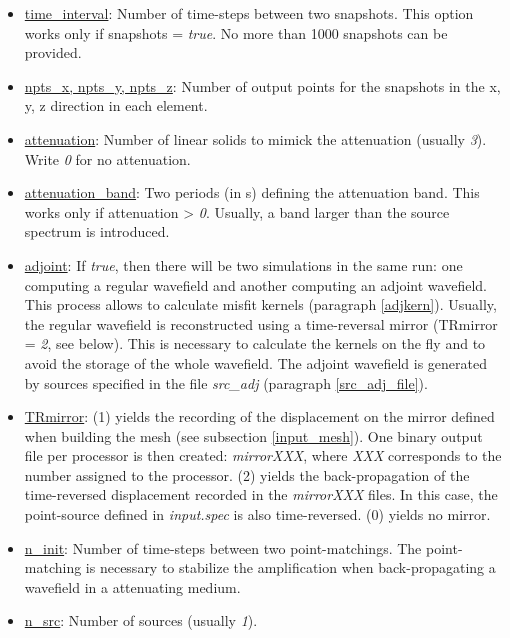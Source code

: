 \begin{itemize}[itemsep=10pt]
\item\underline{time\_interval}: Number of time-steps between two snapshots. This option works only if
snapshots = \textit{true}. No more than 1000 snapshots can be provided.

\item\underline{npts\_x, npts\_y, npts\_z}: Number of output points for the snapshots in the x, y, z direction in each element.

\item\underline{attenuation}: Number of linear solids to mimick the attenuation (usually \textit{3}).
Write \textit{0} for no attenuation.

\item\underline{attenuation\_band}: Two periods (in s) defining the attenuation band. This works only if
attenuation > \textit{0}. Usually, a band larger than the source spectrum is introduced.

\item\underline{adjoint}: If \textit{true}, then there will be two simulations in the same run: one computing
a regular wavefield and another computing an adjoint wavefield. This process allows to calculate misfit kernels
(paragraph \ref{adjkern}). Usually, the regular wavefield is reconstructed using a time-reversal mirror
(TRmirror = \textit{2}, see below). This is necessary to calculate the kernels on the fly and to avoid the
storage of the whole wavefield. The adjoint wavefield is generated by sources specified in the file
\textit{src\_adj} (paragraph \ref{src_adj_file}).

\item\underline{TRmirror}: (1) yields the recording of the displacement on the mirror defined when
building the mesh (see subsection \ref{input_mesh}). One binary output file per processor is then created:
\textit{mirrorXXX}, where \textit{XXX} corresponds to the number assigned to the processor. (2) yields
the back-propagation of the time-reversed displacement recorded in the \textit{mirrorXXX} files. In this case,
the point-source defined in \textit{input.spec} is also time-reversed. (0) yields no mirror.

\item\underline{n\_init}: Number of time-steps between two point-matchings. The point-matching is necessary to stabilize the amplification when back-propagating a wavefield in a attenuating medium.

\item\underline{n\_src}: Number of sources (usually \textit{1}).


\end{itemize}
